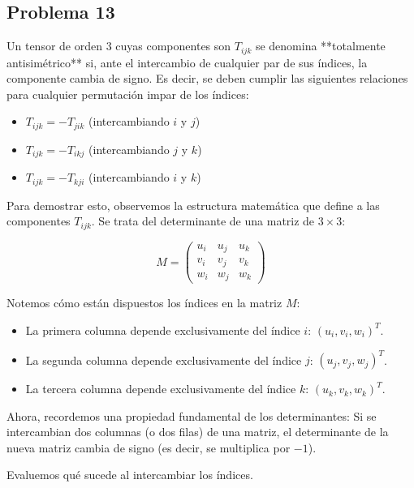 \documentclass[11pt,spanish]{article}
\begin{document}
\subsection*{Problema 13}

Un tensor de orden 3 cuyas componentes son $T_{ijk}$ se denomina **totalmente antisimétrico** si, ante el intercambio de cualquier par de sus índices, la componente cambia de signo. Es decir, se deben cumplir las siguientes relaciones para cualquier permutación impar de los índices:
\begin{itemize}
\item $T_{ijk} = -T_{jik}$ (intercambiando $i$ y $j$)
\item $T_{ijk} = -T_{ikj}$ (intercambiando $j$ y $k$)
\item $T_{ijk} = -T_{kji}$ (intercambiando $i$ y $k$)
\end{itemize}

Para demostrar esto, observemos la estructura matemática que define a las componentes $T_{ijk}$. Se trata del determinante de una matriz de $3 \times 3$:

$$M = \begin{pmatrix} 
u_i & u_j & u_k \\ 
v_i & v_j & v_k \\ 
w_i & w_j & w_k 
\end{pmatrix}$$

Notemos cómo están dispuestos los índices en la matriz $M$:
\begin{itemize}
\item La primera columna depende exclusivamente del índice $i$: $(u_i, v_i, w_i)^T$.
\item La segunda columna depende exclusivamente del índice $j$: $(u_j, v_j, w_j)^T$.
\item  La tercera columna depende exclusivamente del índice $k$: $(u_k, v_k, w_k)^T$.
\end{itemize}

Ahora, recordemos una propiedad fundamental de los determinantes: Si se intercambian dos columnas (o dos filas) de una matriz, el determinante de la nueva matriz cambia de signo (es decir, se multiplica por $-1$).

Evaluemos qué sucede al intercambiar los índices. 
\end{document}
